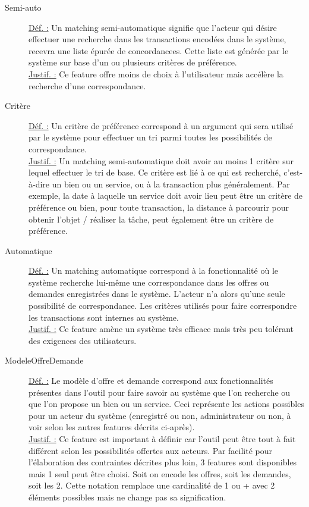 \begin{description}
\item [Semi-auto]
\underline{Déf. :}  Un matching semi-automatique signifie que l'acteur qui désire effectuer une recherche dans les transactions encodées dans le système,  recevra une liste épurée de concordancees.  Cette liste est générée par le système sur base d'un ou plusieurs critères de préférence.
\\ \underline{Justif. :}  Ce feature offre moins de choix à l'utilisateur mais accélère la recherche d'une correspondance.
\newline

\item [Critère]
\underline{Déf. :}  Un critère de préférence correspond à un argument qui sera utilisé par le système pour effectuer un tri parmi toutes les possibilités de correspondance.
\\ \underline{Justif. :}  Un matching semi-automatique doit avoir au moins 1 critère sur lequel effectuer le tri de base.  Ce critère est lié à ce qui est recherché,  c'est-à-dire un bien ou un service,  ou à la transaction plus généralement.  Par exemple,  la date à laquelle un service doit avoir lieu peut être un critère de préférence ou bien,  pour toute transaction,  la distance à parcourir pour obtenir l'objet / réaliser la tâche,  peut également être un critère de préférence.   
\newline

\item [Automatique]
\underline{Déf. :}  Un matching automatique correspond à la fonctionnalité où le système recherche lui-même une correspondance dans les offres ou demandes enregistrées dans le système.  L'acteur n'a alors qu'une seule possibilité de correspondance.  Les critères utilisés pour faire correspondre les transactions sont internes au système.
\\ \underline{Justif. :}  Ce feature amène un système très efficace mais très peu tolérant des exigences des utilisateurs.  
\newline

\item [ModeleOffreDemande]
\label{featOD}
\underline{Déf. :}  Le modèle d'offre et demande correspond aux fonctionnalités présentes dans l'outil pour faire savoir au système que l'on recherche ou que l'on propose un bien ou un service.  Ceci représente les actions possibles pour un acteur du système (enregistré ou non,  administrateur ou non,  à voir selon les autres features décrits ci-après).
\\ \underline{Justif. :}  Ce feature est important à définir car l'outil peut être tout à fait différent selon les possibilités offertes aux acteurs.  Par facilité pour l'élaboration des contraintes décrites plus loin,  3 features sont disponibles mais 1 seul peut être choisi.  Soit on encode les offres,  soit les demandes,  soit les 2.  Cette notation remplace une cardinalité de 1 ou + avec 2 éléments possibles mais ne change pas sa signification.
\newline


\end{description}
